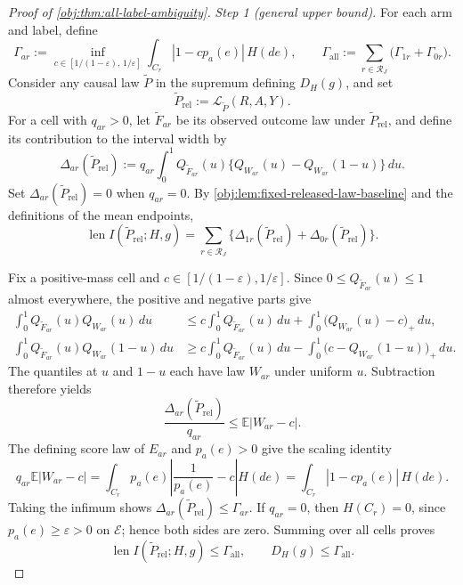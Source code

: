 \begin{proof}[Proof of \cref{obj:thm:all-label-ambiguity}]
\textit{Step 1 (general upper bound).}
For each arm and label, define
\[
\Gamma_{ar}
:=\inf_{c\in[1/(1-\varepsilon),\,1/\varepsilon]}
       \int_{C_r}|1-cp_a(e)|\,H(de),
\qquad
\Gamma_{\mathrm{all}}:=\sum_{r\in\mathcal R_J}
       \bigl(\Gamma_{1r}+\Gamma_{0r}\bigr).
\]
Consider any causal law \(\widetilde P\) in the supremum defining \(D_H(g)\), and set
\[
\widetilde P_{\mathrm{rel}}
:=\mathcal L_{\widetilde P}(R,A,Y).
\]
For a cell with \(q_{ar}>0\), let \(\widetilde F_{ar}\) be its observed outcome law under \(\widetilde P_{\mathrm{rel}}\), and define its contribution to the interval width by
\[
\Delta_{ar}(\widetilde P_{\mathrm{rel}})
:=q_{ar}\int_0^1 Q_{\widetilde F_{ar}}(u)
       \bigl\{Q_{W_{ar}}(u)-Q_{W_{ar}}(1-u)\bigr\}\,du.
\]
Set \(\Delta_{ar}(\widetilde P_{\mathrm{rel}})=0\) when \(q_{ar}=0\). By \cref{obj:lem:fixed-released-law-baseline} and the definitions of the mean endpoints,
\[
\operatorname{len}I(\widetilde P_{\mathrm{rel}};H,g)
=\sum_{r\in\mathcal R_J}
 \bigl\{\Delta_{1r}(\widetilde P_{\mathrm{rel}})
       +\Delta_{0r}(\widetilde P_{\mathrm{rel}})\bigr\}.
\]

Fix a positive-mass cell and \(c\in[1/(1-\varepsilon),1/\varepsilon]\). Since \(0\le Q_{\widetilde F_{ar}}(u)\le1\) almost everywhere, the positive and negative parts give
\[
\begin{aligned}
\int_0^1 Q_{\widetilde F_{ar}}(u)Q_{W_{ar}}(u)\,du
&\le c\int_0^1Q_{\widetilde F_{ar}}(u)\,du
   +\int_0^1\bigl(Q_{W_{ar}}(u)-c\bigr)_+\,du,\\
\int_0^1 Q_{\widetilde F_{ar}}(u)Q_{W_{ar}}(1-u)\,du
&\ge c\int_0^1Q_{\widetilde F_{ar}}(u)\,du
   -\int_0^1\bigl(c-Q_{W_{ar}}(1-u)\bigr)_+\,du.
\end{aligned}
\]
The quantiles at \(u\) and \(1-u\) each have law \(W_{ar}\) under uniform \(u\). Subtraction therefore yields
\[
\frac{\Delta_{ar}(\widetilde P_{\mathrm{rel}})}{q_{ar}}
\le \mathbb E|W_{ar}-c|.
\]
The defining score law of \(E_{ar}\) and \(p_a(e)>0\) give the scaling identity
\[
q_{ar}\mathbb E|W_{ar}-c|
=\int_{C_r}p_a(e)\left|\frac1{p_a(e)}-c\right|H(de)
=\int_{C_r}|1-cp_a(e)|\,H(de).
\]
Taking the infimum shows \(\Delta_{ar}(\widetilde P_{\mathrm{rel}})\le\Gamma_{ar}\). If \(q_{ar}=0\), then \(H(C_r)=0\), since \(p_a(e)\ge\varepsilon>0\) on \(\mathcal E\); hence both sides are zero. Summing over all cells proves
\[
\operatorname{len}I(\widetilde P_{\mathrm{rel}};H,g)
\le\Gamma_{\mathrm{all}},
\qquad D_H(g)\le\Gamma_{\mathrm{all}}.
\]


\end{proof}
